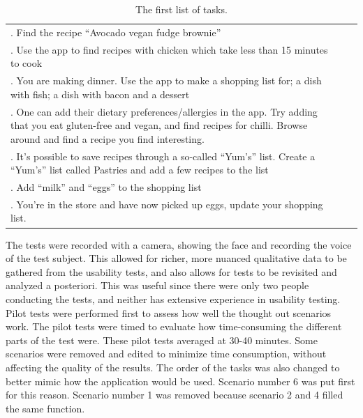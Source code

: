\begin{table}[ht!]
    \centering
    \begin{tabularx}{0.9\textwidth} { 
        | >{\raggedright\arraybackslash}X 
        | >{\centering\arraybackslash}X 
        | >{\raggedleft\arraybackslash}X | }
        \hline
        1. Find the recipe “Avocado vegan fudge brownie” \\
        2. Use the app to find recipes with chicken which take less than 15 minutes to cook \\
        3. You are making dinner. Use the app to make a shopping list for; a dish with fish; a dish with bacon and a dessert \\
        4. One can add their dietary preferences/allergies in the app. Try adding that you eat gluten-free and vegan, and find recipes for chilli. Browse around and find a recipe you find interesting. \\
        5. It’s possible to save recipes through a so-called “Yum’s” list. Create a “Yum’s” list called Pastries and add a few recipes to the list \\
        6. Add “milk” and “eggs” to the shopping list \\
        7. You’re in the store and have now picked up eggs, update your shopping list. \\
        \hline
    \end{tabularx}
    \caption{\label{tab:usability-test-tasks} The first list of tasks.}
\end{table}

The tests were recorded with a camera, showing the face and recording the voice of the test subject. This allowed for richer, more nuanced qualitative data to be gathered from the usability tests, and also allows for tests to be revisited and analyzed a posteriori. This was useful since there were only two people conducting the tests, and neither has extensive experience in usability testing. \\
Pilot tests were performed first to assess how well the thought out scenarios work. The pilot tests were timed to evaluate how time-consuming the different parts of the test were. These pilot tests averaged at 30-40 minutes. Some scenarios were removed and edited to minimize time consumption, without affecting the quality of the results. The order of the tasks was also changed to better mimic how the application would be used. Scenario number 6 was put first for this reason.  Scenario number 1 was removed because scenario 2 and 4 filled the same function.

